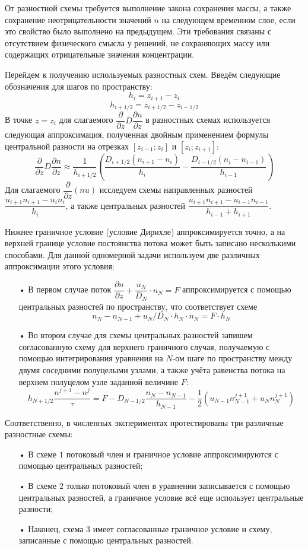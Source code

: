 \documentclass[14pt, a4paper, fleqn]{extarticle}
\begin{document}
От разностной схемы требуется выполнение закона сохранения массы, а также сохранение неотрицательности значений $n$ на следующем временном слое, если это свойство было выполнено на предыдущем. Эти требования связаны с отсутствием физического смысла у решений, не сохраняющих массу или содержащих отрицательные значения концентрации.

Перейдем к получению используемых разностных схем. Введём следующие обозначения для шагов по пространству: $$h_i = z_{i+1}-z_i$$ $$h_{i+1/2}=z_{i+1/2}-z_{i-1/2}$$
В точке $z=z_i$ для слагаемого $\dfrac{\partial}{\partial z}D\dfrac{\partial n}{\partial z}$ в разностных схемах используется следующая аппроксимация, полученная двойным применением формулы центральной разности на отрезках $[z_{i-1};z_i]$ и $[z_i; z_{i+1}]$: 
$$\dfrac{\partial}{\partial z}D\dfrac{\partial n}{\partial z} \approx \dfrac{1}{h_{i+1/2}}\left(\dfrac{D_{i+1/2}(n_{i+1}-n_i)}{h_i}-\dfrac{D_{i-1/2}(n_{i}-n_{i-1})}{h_{i-1}}\right)$$
Для слагаемого $\dfrac{\partial}{\partial z}(nu)$ исследуем схемы направленных разностей $\dfrac{u_{i+1}n_{i+1}-u_{i}n_{i}}{h_i}$, а также центральных разностей $\dfrac{u_{i+1}n_{i+1}-u_{i-1}n_{i-1}}{h_{i-1}+h_{i+1}}$.

Нижнее граничное условие (условие Дирихле) аппроксимируется точно, а на верхней границе условие постоянства потока может быть записано несколькими способами. Для данной одномерной задачи используем две различных аппроксимации этого условия:

\begin{itemize}
\item[•] В первом случае поток $\dfrac{\partial n}{\partial z}+\dfrac{u_N}{D_N}\cdot n_N=F$ аппроксимируется с помощью центральных разностей по пространству, что соответствует схеме $$n_N-n_{N-1}+u_N/D_N\cdot h_N\cdot n_N = F\cdot h_N$$
\item[•] Во втором случае для схемы центральных разностей запишем согласованную схему для верхнего граничного случая, получаемую с помощью интегрирования уравнения на $N$-ом шаге по пространству между двумя соседними полуцелыми узлами, а также учёта равенства потока на верхнем полуцелом узле заданной величине $F$: $$h_{N+1/2}\dfrac{n^{j+1}-n^j}{\tau}= F - D_{N-1/2}\dfrac{n_N-n_{N-1}}{h_{N-1}}-\dfrac{1}{2}(u_{N-1}n_{N-1}^{j+1}+u_{N}n_{N}^{j+1})$$
\end{itemize}

Соответственно, в численных экспериментах протестированы три различные разностные схемы: 
\begin{itemize}
\item[•] В схеме $1$ потоковый член и граничное условие аппроксимируются с помощью центральных разностей; 
\item[•] В схеме $2$ только потоковый член в уравнении записывается с помощью центральных разностей, а граничное условие всё еще использует центральные разности;
\item[•] Наконец, схема $3$ имеет согласованные граничное условие и схему, записанные с помощью центральных разностей.
\end{itemize}
\end{document}
